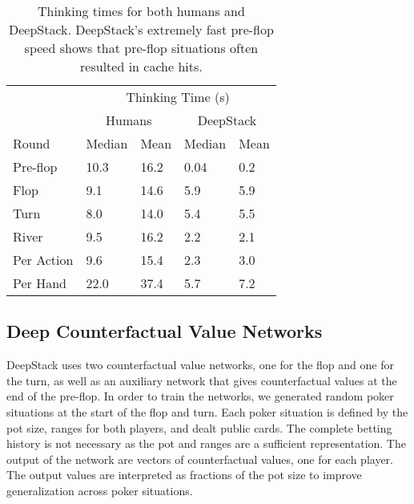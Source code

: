 \begin{table}[tb]
\centering
\caption{Thinking times for both humans and DeepStack.
DeepStack's extremely fast pre-flop speed shows that pre-flop situations often resulted in cache hits.}
\label{tab-times}
\begin{tabular}{l|ll|ll}
\toprule
           & \multicolumn{4}{c}{Thinking Time (s)} \\
& \multicolumn{2}{c}{Humans} & \multicolumn{2}{c}{DeepStack} \\
Round & Median & Mean & Median & Mean \\
\midrule
Pre-flop & 10.3 & 16.2 & 0.04 & 0.2 \\
Flop & 9.1 & 14.6 & 5.9 & 5.9 \\
Turn & 8.0 & 14.0 & 5.4 & 5.5 \\
River & 9.5 & 16.2 & 2.2 & 2.1 \\
\midrule
Per Action & 9.6 & 15.4 & 2.3 & 3.0 \\
Per Hand & 22.0 & 37.4 & 5.7 & 7.2 \\
 \bottomrule
\end{tabular}
\end{table}

\subsection*{Deep Counterfactual Value Networks}

DeepStack uses two counterfactual value networks, one for the flop and one for the turn, as well as an auxiliary network that gives counterfactual values at the end of the pre-flop.  In order to train the networks, we generated random poker situations at the start of the flop and turn.  Each poker situation is defined by the pot size, ranges for both players, and dealt public cards.  The complete betting history is not necessary as the pot and ranges are a sufficient representation.  The output of the network are vectors of counterfactual values, one for each player.  The output values are interpreted as fractions of the pot size to improve generalization across poker situations. 

